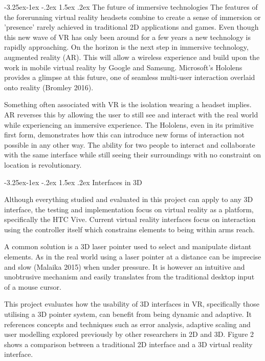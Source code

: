 \documentclass[12pt]{article}
\makeatletter
\renewcommand{\subsection}{\@startsection{subsection}{2}{\z@}%
             {-3.25ex\@plus -1ex \@minus -.2ex}%
             {1.5ex \@plus .2ex}%
             {\normalfont\large\scshape\bfseries}}
\makeatother
\begin{document}
\subsection{The future of immersive technologies}
The features of the forerunning virtual reality headsets combine to create a sense of immersion or 'presence' rarely achieved in traditional 2D applications and games. Even though this new wave of VR has only been around for a few years a new technology is rapidly approaching. On the horizon is the next step in immersive technology, augmented reality (AR). This will allow a wireless experience and build upon the work in mobile virtual reality by Google and Samsung. Microsoft's Hololens provides a glimpse at this future, one of seamless multi-user interaction overlaid onto reality (Bromley 2016). 

Something often associated with VR is the isolation wearing a headset implies. AR reverses this by allowing the user to still see and interact with the real world while experiencing an immersive experience. The Hololens, even in its primitive first form, demonstrates how this can introduce new forms of interaction not possible in any other way. The ability for two people to interact and collaborate with the same interface while still seeing their surroundings with no constraint on location is revolutionary.

\subsection{Interfaces in 3D}

Although everything studied and evaluated in this project can apply to any 3D interface, the testing and implementation focus on virtual reality as a platform, specifically the HTC Vive. Current virtual reality interfaces focus on interaction using the controller itself which constrains elements to being within arms reach.

A common solution is a 3D laser pointer used to select and manipulate distant elements. As in the real world using a laser pointer at a distance can be imprecise and slow (Malaika 2015) when under pressure. It is however an intuitive and unobtrusive mechanism and easily translates from the traditional desktop input of a mouse cursor.

This project evaluates how the usability of 3D interfaces in VR, specifically those utilising a 3D pointer system, can benefit from being dynamic and adaptive. It references concepts and techniques such as error analysis, adaptive scaling and user modelling explored previously by other researchers in 2D and 3D. Figure 2 shows a comparison between a traditional 2D interface and a 3D virtual reality interface.
\end{document}
